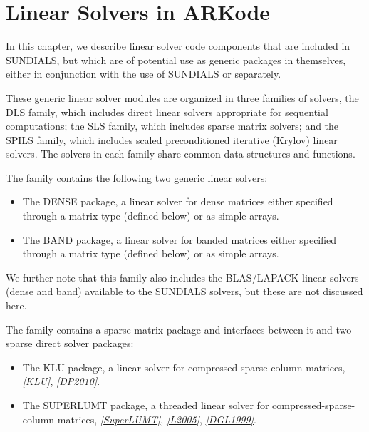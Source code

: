 \documentclass[letterpaper,10pt,english]{sphinxmanual}
\begin{document}
\chapter{Linear Solvers in ARKode}
\label{linear_solvers/index:linearsolvers}\label{linear_solvers/index::doc}\label{linear_solvers/index:linear-solvers-in-arkode}
In this chapter, we describe linear solver code components that are
included in SUNDIALS, but which are of potential use as generic
packages in themselves, either in conjunction with the use of SUNDIALS
or separately.

These generic linear solver modules are organized in three families of
solvers, the DLS family, which includes direct linear solvers
appropriate for sequential computations; the SLS family, which
includes sparse matrix solvers; and the SPILS family, which includes
scaled preconditioned iterative (Krylov) linear solvers. The solvers
in each family share common data structures and functions.

The {\hyperref[linear_solvers/DLS:linearsolvers-dls]{\emph{}}} family contains the following two
generic linear solvers:
\begin{itemize}
\item {} 
The DENSE package, a linear solver for dense matrices either
specified through a matrix type (defined below) or as simple
arrays.

\item {} 
The BAND package, a linear solver for banded matrices either
specified through a matrix type (defined below) or as simple
arrays.

\end{itemize}

We further note that this family also includes the BLAS/LAPACK linear
solvers (dense and band) available to the SUNDIALS solvers, but these
are not discussed here.

The {\hyperref[linear_solvers/SLS:linearsolvers-sls]{\emph{}}} family contains a sparse matrix
package and interfaces between it and two sparse direct solver packages:
\begin{itemize}
\item {} 
The KLU package, a linear solver for compressed-sparse-column
matrices, \label{linear_solvers/index:id1}{\hyperref[References:klu]{\emph{{[}KLU{]}}}}, \label{linear_solvers/index:id2}{\hyperref[References:dp2010]{\emph{{[}DP2010{]}}}}.

\item {} 
The SUPERLUMT package, a threaded linear solver for
compressed-sparse-column matrices, \label{linear_solvers/index:id3}{\hyperref[References:superlumt]{\emph{{[}SuperLUMT{]}}}}, \label{linear_solvers/index:id4}{\hyperref[References:l2005]{\emph{{[}L2005{]}}}}, \label{linear_solvers/index:id5}{\hyperref[References:dgl1999]{\emph{{[}DGL1999{]}}}}.

\end{itemize}
\end{document}
